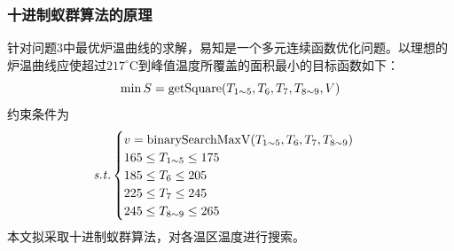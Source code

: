 \documentclass[../main.tex]{subfiles}
\begin{document}
\subsubsection{十进制蚁群算法的原理}
针对问题3中最优炉温曲线的求解，易知是一个多元连续函数优化问题。以理想的炉温曲线应使超过\(217 ^{\circ}\mathrm{C}\)到峰值温度所覆盖的面积最小的目标函数如下：
\begin{equation}
\min S = \mathrm{getSquare} (T _{1 {\sim} 5},T _{6} , T _{7} , T _{8 {\sim} 9}, V) \\
\end{equation}
约束条件为
\begin{equation}{\it s.t.}
\begin{cases}
v = \mathrm{binarySearchMaxV} (T _{1{\sim} 5}, T_{6} , T _{7},T_{8{\sim} 9})\\
165 \le T_{1 {\sim} 5} \le 175\\
185 \le T _{6} \le 205 \\
225 \le T _{7} \le 245 \\
245 \le T _{8 {\sim} 9} \le 265
\end{cases}
\end{equation}
本文拟采取十进制蚁群算法，对各温区温度进行搜索。
\end{document}
